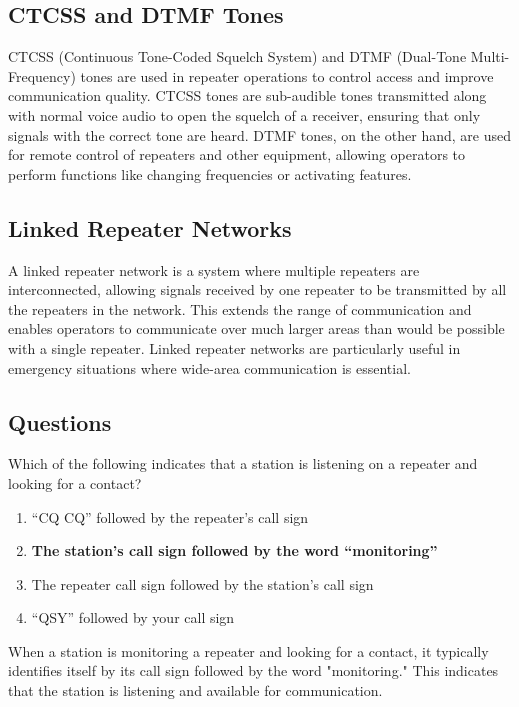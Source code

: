 \subsection*{CTCSS and DTMF Tones}
CTCSS (Continuous Tone-Coded Squelch System) and DTMF (Dual-Tone Multi-Frequency) tones are used in repeater operations to control access and improve communication quality. CTCSS tones are sub-audible tones transmitted along with normal voice audio to open the squelch of a receiver, ensuring that only signals with the correct tone are heard. DTMF tones, on the other hand, are used for remote control of repeaters and other equipment, allowing operators to perform functions like changing frequencies or activating features.

\subsection*{Linked Repeater Networks}
A linked repeater network is a system where multiple repeaters are interconnected, allowing signals received by one repeater to be transmitted by all the repeaters in the network. This extends the range of communication and enables operators to communicate over much larger areas than would be possible with a single repeater. Linked repeater networks are particularly useful in emergency situations where wide-area communication is essential.

\subsection*{Questions}
\begin{tcolorbox}[colback=gray!10!white,colframe=black!75!black,title={T2A09}]
    Which of the following indicates that a station is listening on a repeater and looking for a contact?
    \begin{enumerate}[label=\Alph*),noitemsep]
        \item “CQ CQ” followed by the repeater’s call sign
        \item \textbf{The station’s call sign followed by the word “monitoring”}
        \item The repeater call sign followed by the station’s call sign
        \item “QSY” followed by your call sign
    \end{enumerate}
\end{tcolorbox}
When a station is monitoring a repeater and looking for a contact, it typically identifies itself by its call sign followed by the word "monitoring." This indicates that the station is listening and available for communication.

